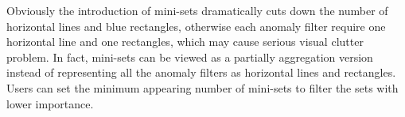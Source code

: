 \documentclass[format=acmsmall, review=false, screen=true]{acmart}
\newcommand{\ti}{\textcolor[rgb]{0,0,0}}
\newcommand{\tii}{\textcolor[rgb]{0,0,0}}
\begin{document}
\ti{Obviously the introduction of mini-sets dramatically cuts down the number of horizontal lines and blue rectangles, otherwise each anomaly filter require one horizontal line and one rectangles, which may cause serious visual clutter problem. In fact, mini-sets can be viewed as a partially aggregation version instead of representing all the anomaly filters as horizontal lines and rectangles.
Users can set the minimum appearing number of mini-sets to filter the sets with lower importance.}%
\end{document}
